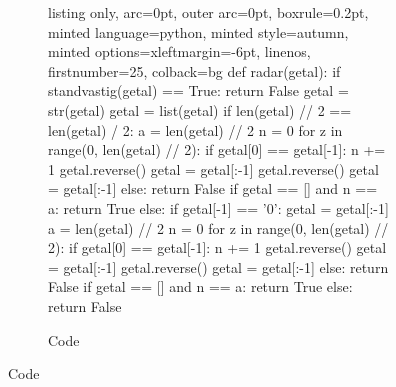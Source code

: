 
\begin{figure}[H]
\caption{Submision 7}
\label{sbm:sub7}
  \begin{subfigure}{\textwidth}
        \caption{Code}
        \label{sbm:sub7_code}

  \begin{tcblisting}{listing only, 
    arc=0pt,
    outer arc=0pt, 
    boxrule=0.2pt,
    minted language=python,
    minted style=autumn,
    minted options={xleftmargin=-6pt, linenos, firstnumber=25},
    colback=bg }
def radar(getal):
    if standvastig(getal) == True:
        return False
    getal = str(getal)
    getal = list(getal)
    if len(getal) // 2 == len(getal) / 2:
        a = len(getal) // 2
        n = 0
        for z in range(0, len(getal) // 2):
            if getal[0] == getal[-1]:
                n += 1
                getal.reverse()
                getal = getal[:-1]
                getal.reverse()
                getal = getal[:-1]
            else:
                return False
            if getal == [] and n == a:
                return True
    else:
        if getal[-1] == '0':
            getal = getal[:-1]
            a = len(getal) // 2
            n = 0
            for z in range(0, len(getal) // 2):
                if getal[0] == getal[-1]:
                    n += 1
                    getal.reverse()
                    getal = getal[:-1]
                    getal.reverse()
                    getal = getal[:-1]
                else:
                    return False
                if getal == [] and n == a:
                    return True
        else:
            return False 
\end{tcblisting}
\end{subfigure}
\end{figure}
\clearpage
